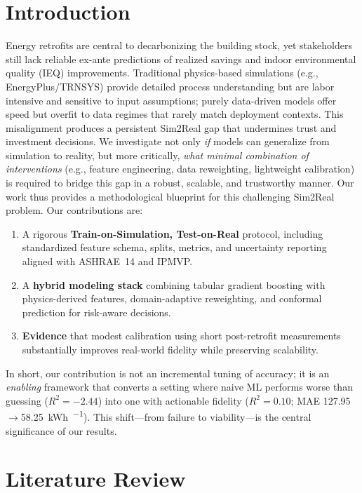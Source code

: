 ﻿\documentclass{article}
\begin{document}
\section{Introduction}
Energy retrofits are central to decarbonizing the building stock, yet stakeholders still lack reliable ex-ante predictions of realized savings and indoor environmental quality (IEQ) improvements.
Traditional physics-based simulations (e.g., EnergyPlus/TRNSYS) provide detailed process understanding but are labor intensive and sensitive to input assumptions;
purely data-driven models offer speed but overfit to data regimes that rarely match deployment contexts.
This misalignment produces a persistent Sim2Real gap that undermines trust and investment decisions.
We investigate not only \emph{if} models can generalize from simulation to reality, but more critically, \emph{what minimal combination of interventions} (e.g., feature engineering, data reweighting, lightweight calibration) is required to bridge this gap in a robust, scalable, and trustworthy manner. Our work thus provides a methodological blueprint for this challenging Sim2Real problem.
Our contributions are:
\begin{enumerate}[leftmargin=8mm]
\item A rigorous \textbf{Train-on-Simulation, Test-on-Real} protocol, including standardized feature schema, splits, metrics, and uncertainty reporting aligned with ASHRAE~14 and IPMVP.
\item A \textbf{hybrid modeling stack} combining tabular gradient boosting with physics-derived features, domain-adaptive reweighting, and conformal prediction for risk-aware decisions.
\item \textbf{Evidence} that modest calibration using short post-retrofit measurements substantially improves real-world fidelity while preserving scalability.
\end{enumerate}

\noindent In short, our contribution is not an incremental tuning of accuracy; it is an \emph{enabling} framework that converts a setting where naive ML performs worse than guessing ($R^2=-2.44$) into one with actionable fidelity ($R^2=0.10$; MAE 127.95 $\rightarrow$58.25~\si{\kWh\per\month}). This shift---from failure to viability---is the central significance of our results.

\section{Literature Review}
\end{document}

